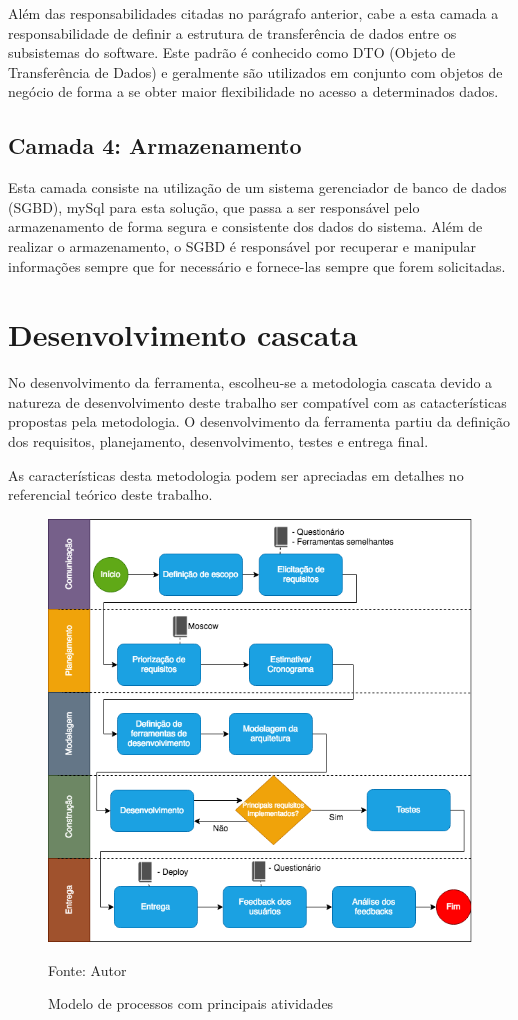 Além das responsabilidades citadas no parágrafo anterior, cabe a esta camada a responsabilidade de definir a estrutura de transferência de dados entre os subsistemas
do software. Este padrão é conhecido como DTO (Objeto de Transferência de Dados) e geralmente são utilizados em conjunto com objetos de negócio de forma a se obter maior
flexibilidade no acesso a determinados dados.

\subsection{Camada 4: Armazenamento}
Esta camada consiste na utilização de um sistema gerenciador de banco de dados (SGBD), mySql para esta solução, que passa a ser responsável pelo armazenamento de forma segura e consistente
dos dados do sistema. Além de realizar o armazenamento, o SGBD é responsável por recuperar e manipular informações sempre que for necessário e fornece-las sempre que forem solicitadas.

\section{Desenvolvimento cascata}

No desenvolvimento da ferramenta, escolheu-se a metodologia cascata devido a natureza de desenvolvimento deste trabalho ser compatível com as 
catacterísticas propostas pela metodologia. O desenvolvimento da ferramenta partiu da definição dos requisitos, planejamento, desenvolvimento, testes e entrega final.

As características desta metodologia podem ser apreciadas em detalhes no referencial teórico deste trabalho.

\begin{figure}[h]
	\centering
	\includegraphics[keepaspectratio=true,scale=0.6]{figuras/modeloprocesso.png}
	\caption{Modelo de processos com principais atividades}
	Fonte: {Autor}
	\label{modeloprocesso}
\end{figure}	

